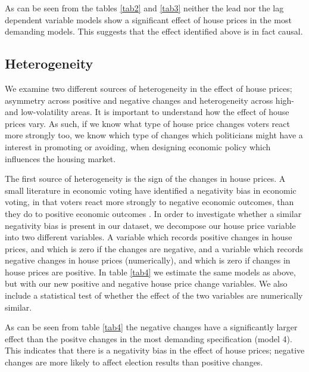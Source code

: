 \documentclass[12pt,a4paper]{article}
\begin{document}





As can be seen from the tables \ref{tab2} and \ref{tab3} neither the lead nor the lag dependent variable models show a significant  effect of house prices in the most demanding models. This suggests that the effect identified above is in fact causal.



\subsection{Heterogeneity}

We examine two different sources of heterogeneity in the effect of house prices; asymmetry across positive and negative changes and heterogeneity across high- and low-volatility areas.  It is important to understand how the effect of house prices vary. As such, if we know what type of house price changes voters react more strongly too, we know which type of changes which politicians might have a interest in promoting or avoiding,  when designing economic policy which influences the housing market. %

The first source of heterogeneity is the sign of the changes in house prices. A small literature in economic voting have identified a negativity bias in economic voting, in that voters react more strongly to negative economic outcomes, than they do to positive economic outcomes \citep[e.g.][]{bloom1975voter}. In order to investigate whether a similar negativity bias is present in our dataset, we decompose our house price variable into two different variables. A variable which records positive changes in house prices, and which is zero if the changes are negative, and a variable which records negative changes in house prices (numerically), and which is zero if changes in house prices are positive. In table \ref{tab4} we estimate the same models as above, but with our new positive and negative house price change variables. We also include a statistical test of whether the effect of the two variables are numerically similar. 

As can be seen from table \ref{tab4} the negative changes have a significantly larger effect than the positve changes in the most demanding specification (model 4). This indicates that there is a negativity bias in the effect of house prices; negative changes are more likely to affect election results than positive changes. 
\end{document}
